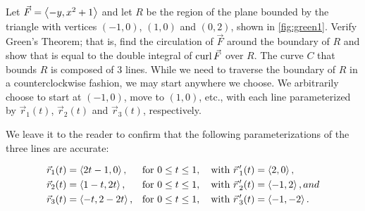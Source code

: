 \begin{example}\label{ex_green1}%
%
%
Let $\vec F =\left\langle -y,x^2+1\right\rangle$ and let $R$ be the region of the plane bounded by the triangle with vertices $(-1,0)$, $(1,0)$ and $(0,2)$, shown in \autoref{fig:green1}. Verify Green's Theorem; that is, find the circulation of $\vec F$ around the boundary of $R$ and show that is equal to the double integral of $\operatorname{curl} \vec F$ over $R$.
\solution
The curve $C$ that bounds $R$ is composed of 3 lines. While we need to traverse the boundary of $R$ in a counterclockwise fashion, we may start anywhere we choose. We arbitrarily choose to start at $(-1,0)$, move to $(1,0)$, etc., with each line parameterized by $\vec r_1(t)$, $\vec r_2(t)$ and $\vec r_3(t)$, respectively.

We leave it to the reader to confirm that the following parameterizations of the three lines are accurate:

\begin{align*}
\vec r_1(t) &=\left\langle 2t-1,0\right\rangle, && \text{for }0\leq t\leq 1,\quad\text{with }\vec r\hskip1.25pt '_1(t) =\left\langle  2,0\right\rangle,\\
\vec r_2(t) &=\left\langle 1-t,2t\right\rangle, && \text{for }0\leq t\leq 1,\quad\text{with }\vec r\hskip1.25pt '_2(t) =\left\langle  -1,2\right\rangle, and\\
\vec r_3(t) &=\left\langle -t,2-2t\right\rangle, && \text{for }0\leq t\leq 1,\quad\text{with } \vec r\hskip1.25pt '_3(t) =\left\langle  -1,-2\right\rangle.
\end{align*}


\end{example}
